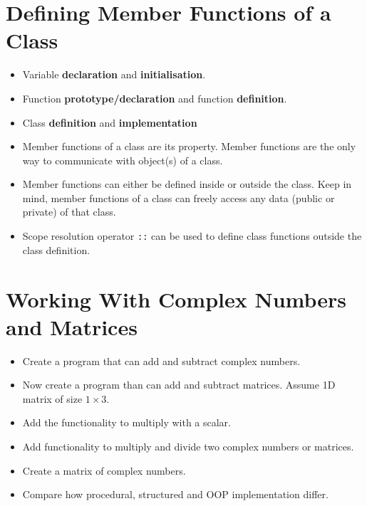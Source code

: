\documentclass[12pt,a4paper]{article}
\begin{document}
\section{Defining Member Functions of a Class}
\begin{itemize}
\item Variable \textbf{declaration} and \textbf{initialisation}.
\item Function \textbf{prototype/declaration} and function \textbf{definition}.
\item Class \textbf{definition} and \textbf{implementation}
\item Member functions of a class are its property. Member functions are the only way to communicate with object(s) of a class.
\item Member functions can either be defined inside or outside the class. Keep in mind, member functions of a class can freely access any data (public or private) of that class.
\item Scope resolution operator \verb|::| can be used to define class functions outside the class definition.
\end{itemize}
\section{Working With Complex Numbers and Matrices}
\begin{itemize}
\item Create a program that can add and subtract complex numbers.
\item Now create a program than can add and subtract matrices. Assume 1D matrix of size $1\times 3$.
\item Add the functionality to multiply with a scalar.
\item Add functionality to multiply and divide two complex numbers or matrices.
\item Create a matrix of complex numbers.
\item Compare how procedural, structured and OOP implementation differ.
\end{itemize}
\end{document}
